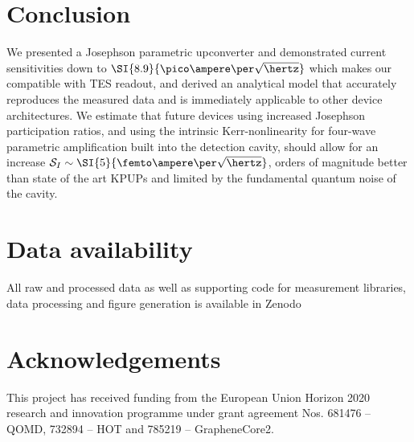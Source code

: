 \section{Conclusion}

We presented a Josephson parametric upconverter and demonstrated current sensitivities down to $\SI{8.9}{\pico\ampere\per\sqrt{\hertz}}$ which makes our compatible with TES readout, and derived an analytical model that accurately reproduces the measured data and is immediately applicable to other device architectures.
% 
We estimate that future devices using increased Josephson participation ratios, and using the intrinsic Kerr-nonlinearity for four-wave parametric amplification built into the detection cavity, should allow for an increase $\mathcal{S}_I\sim\SI{5}{\femto\ampere\per\sqrt{\hertz}}$, orders of magnitude better than state of the art KPUPs and limited by the fundamental quantum noise of the cavity.


\section*{Data availability}
All raw and processed data as well as supporting code for measurement libraries, data processing and figure generation is available in Zenodo~\cite{zenodo1}

\section*{Acknowledgements}
This project has received funding from the European Union Horizon 2020 research and innovation programme under grant agreement Nos. 681476 -- QOMD, 732894 -- HOT and 785219 -- GrapheneCore2.

